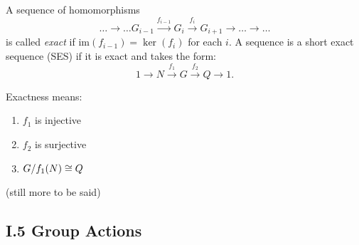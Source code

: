 \documentclass[11pt,leqno,oneside]{amsart}
\begin{document}
\begin{defn*}[1.3.6]
A sequence of homomorphisms
\[\ldots \to \ldots  G_{i-1} \xrightarrow{f_{i-1}}G_i \xrightarrow{f_i} G_{i+1} \to \ldots \to \ldots\]
is called \emph{exact} if \(\text{im}(f_{i-1})=\ker(f_i)\) for each \(i\). A sequence is a short exact sequence
(SES) if it is exact and takes the form:
\[1 \to N \xrightarrow{f_1} G \xrightarrow{f_2} Q \to 1.\]
\end{defn*}
Exactness means:
\begin{enumerate}
\item \(f_1\) is injective
\item \(f_2\) is surjective
\item \(G/f_1(N) \mathrel{\cong} Q\)
\end{enumerate}

(still more to be said)

\subsection{I.5 Group Actions}
\end{document}
